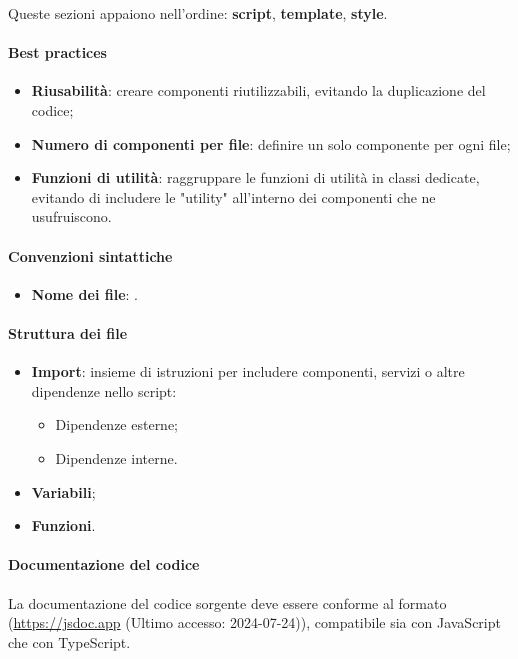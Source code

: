 \vspace{0.5\baselineskip}
\par Queste sezioni appaiono nell'ordine: \textbf{script}, \textbf{template}, \textbf{style}.

\paragraph*{Best practices}
\begin{itemize}
  \item \textbf{Riusabilità}: creare componenti riutilizzabili, evitando la duplicazione del codice;
  \item \textbf{Numero di componenti per file}: definire un solo componente per ogni file;
  \item \textbf{Funzioni di utilità}: raggruppare le funzioni di utilità in classi dedicate, evitando di includere le "utility" all'interno dei componenti che ne usufruiscono.
\end{itemize}

\paragraph*{Convenzioni sintattiche}
\begin{itemize}
  \item \textbf{Nome dei file}: .
\end{itemize}

\paragraph*{Struttura dei file}
\begin{itemize}
  \item \textbf{Import}: insieme di istruzioni per includere componenti, servizi o altre dipendenze nello script:
  \begin{itemize}
    \item Dipendenze esterne;
    \item Dipendenze interne.
  \end{itemize}
  \item \textbf{Variabili};
  \item \textbf{Funzioni}.
\end{itemize}

\paragraph*{Documentazione del codice}
\vspace{0.5\baselineskip}
\par La documentazione del codice sorgente deve essere conforme al formato  (\href{https://jsdoc.app}{https://jsdoc.app} (Ultimo accesso: 2024-07-24)), compatibile sia con JavaScript che con TypeScript.

